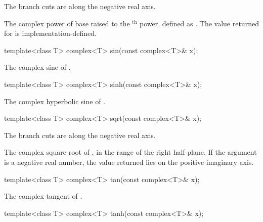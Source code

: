 \begin{itemdescr}
\pnum
\remarks
The branch cuts are along the negative real axis.

\pnum
\returns
The complex power of base  raised to the $^\text{th}$ power,
defined as
.
The value returned for
is implementation-defined.
\end{itemdescr}

%
\begin{itemdecl}
template<class T> complex<T> sin(const complex<T>& x);
\end{itemdecl}

\begin{itemdescr}
\pnum
\returns
The complex sine of .
\end{itemdescr}

%
\begin{itemdecl}
template<class T> complex<T> sinh(const complex<T>& x);
\end{itemdecl}

\begin{itemdescr}
\pnum
\returns
The complex hyperbolic sine of .
\end{itemdescr}

%
\begin{itemdecl}
template<class T> complex<T> sqrt(const complex<T>& x);
\end{itemdecl}

\begin{itemdescr}
\pnum
\remarks
The branch cuts are along the negative real axis.

\pnum
\returns
The complex square root of , in the range of the right
half-plane.
If the argument is a negative real number, the
value returned lies on the positive imaginary axis.
\end{itemdescr}

%
\begin{itemdecl}
template<class T> complex<T> tan(const complex<T>& x);
\end{itemdecl}

\begin{itemdescr}
\pnum
\returns
The complex tangent of .
\end{itemdescr}

%
\begin{itemdecl}
template<class T> complex<T> tanh(const complex<T>& x);
\end{itemdecl}

